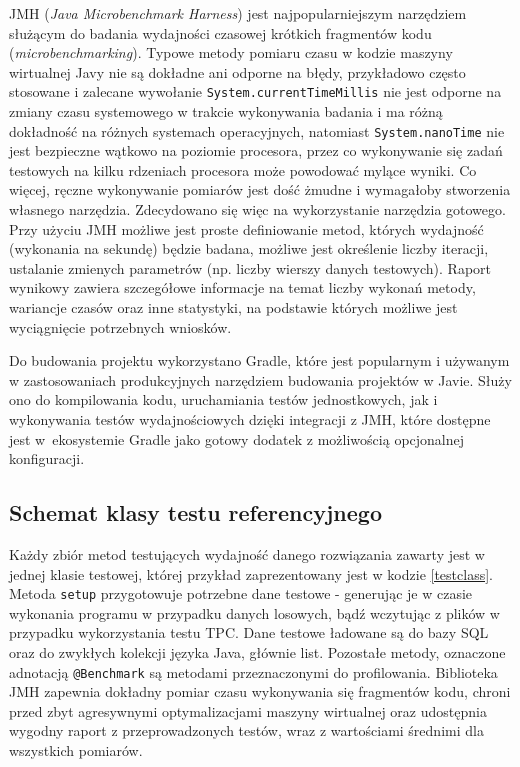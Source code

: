 \documentclass[12pt,twoside,openright]{extarticle}
\begin{document}
    JMH (\textit{Java Microbenchmark Harness}) jest najpopularniejszym narzędziem służącym do badania wydajności czasowej krótkich fragmentów kodu (\textit{microbenchmarking}). Typowe metody pomiaru czasu w kodzie maszyny wirtualnej Javy nie są dokładne ani odporne na błędy, przykładowo często stosowane i zalecane wywołanie \texttt{System.currentTimeMillis} nie jest odporne na zmiany czasu systemowego w trakcie wykonywania badania i ma różną dokładność na różnych systemach operacyjnych, natomiast \texttt{System.nanoTime} nie jest bezpieczne wątkowo na poziomie procesora, przez co wykonywanie się zadań testowych na kilku rdzeniach procesora może powodować mylące wyniki. Co więcej, ręczne wykonywanie pomiarów jest dość żmudne i wymagałoby stworzenia własnego narzędzia. Zdecydowano się więc na wykorzystanie narzędzia gotowego. Przy użyciu JMH możliwe jest proste definiowanie metod, których wydajność (wykonania na sekundę) będzie badana, możliwe jest określenie liczby iteracji, ustalanie zmienych parametrów (np. liczby wierszy danych testowych). Raport wynikowy zawiera szczegółowe informacje na temat liczby wykonań metody, wariancje czasów oraz inne statystyki, na podstawie których możliwe jest wyciągnięcie potrzebnych wniosków.

    Do budowania projektu wykorzystano Gradle, które jest popularnym i używanym w zastosowaniach produkcyjnych narzędziem budowania projektów w Javie. Służy ono do kompilowania kodu, uruchamiania testów jednostkowych, jak i wykonywania testów wydajnościowych dzięki integracji z JMH, które dostępne jest w~ekosystemie Gradle jako gotowy dodatek z możliwością opcjonalnej konfiguracji.

\subsection{Schemat klasy testu referencyjnego}


    Każdy zbiór metod testujących wydajność danego rozwiązania zawarty jest w jednej klasie testowej, której przykład zaprezentowany jest w kodzie \ref{testclass}. Metoda \texttt{setup} przygotowuje potrzebne dane testowe - generując je w czasie wykonania programu w przypadku danych losowych, bądź wczytując z plików w przypadku wykorzystania testu TPC. Dane testowe ładowane są do bazy SQL oraz do zwykłych kolekcji języka Java, głównie list. Pozostałe metody, oznaczone adnotacją \texttt{@Benchmark} są metodami przeznaczonymi do profilowania. Biblioteka JMH zapewnia dokładny pomiar czasu wykonywania się fragmentów kodu, chroni przed zbyt agresywnymi optymalizacjami maszyny wirtualnej oraz udostępnia wygodny raport z przeprowadzonych testów, wraz z wartościami średnimi dla wszystkich pomiarów.
\end{document}

